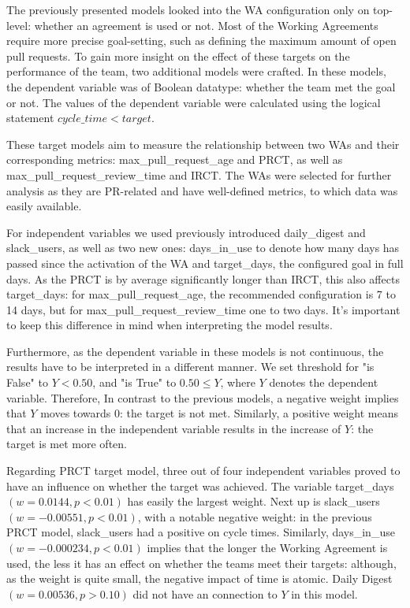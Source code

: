 The previously presented models looked into the WA configuration only on top-level: whether an agreement is used or not. Most of the Working Agreements require more precise goal-setting, such as defining the maximum amount of open pull requests. To gain more insight on the effect of these targets on the performance of the team, two additional models were crafted. In these models, the dependent variable was of Boolean datatype: whether the team met the goal or not. The values of the dependent variable were calculated using the logical statement $cycle\_time < target$. 

These target models aim to measure the relationship between two WAs and their corresponding metrics: max\_pull\_request\_age and PRCT, as well as max\_pull\_request\_review\_time and IRCT. The WAs were selected for further analysis as they are PR-related and have well-defined metrics, to which data was easily available.

For independent variables we used previously introduced daily\_digest and slack\_users, as well as two new ones: days\_in\_use to denote how many days has passed since the activation of the WA and target\_days, the configured goal in full days. As the PRCT is by average significantly longer than IRCT, this also affects target\_days: for max\_pull\_request\_age, the recommended configuration is 7 to 14 days, but for max\_pull\_request\_review\_time one to two days. It's important to keep this difference in mind when interpreting the model results. 

Furthermore, as the dependent variable in these models is not continuous, the results have to be interpreted in a different manner. We set threshold for "is False" to  $Y<0.50$, and "is True" to $0.50\leq Y$, where $Y$ denotes the dependent variable. Therefore, In contrast to the previous models, a negative weight implies that $Y$ moves towards 0: the target is not met. Similarly, a positive weight means that an increase in the independent variable results in the increase of $Y$: the target is met more often.



Regarding PRCT target model, three out of four independent variables proved to have an influence on whether the target was achieved. The variable target\_days $(w=0.0144, p<0.01)$ has easily the largest weight. Next up is slack\_users $(w=-0.00551, p<0.01)$, with a notable negative weight: in the previous PRCT model, slack\_users had a positive on cycle times. Similarly, days\_in\_use $(w=-0.000234, p<0.01)$ implies that the longer the Working Agreement is used, the less it has an effect on whether the teams meet their targets: although, as the weight is quite small, the negative impact of time is atomic. Daily Digest $(w=0.00536, p>0.10)$ did not have an connection to $Y$ in this model. 

